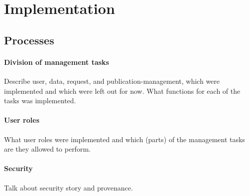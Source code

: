 \section{Implementation}

\subsection{Processes}
\paragraph{Division of management tasks}
Describe user, data, request, and publication-management, which were implemented and which were left out for now.
What functions for each of the tasks was implemented.

\paragraph{User roles}
What user roles were implemented and which (parts) of the management tasks are they allowed to perform.

\paragraph{Security}
Talk about security story and provenance.